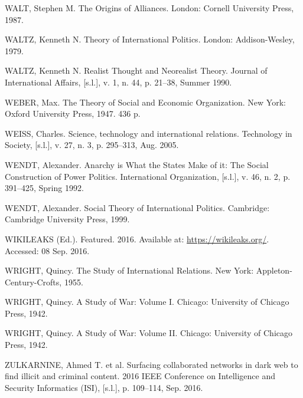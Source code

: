 \begin{list}{}{\setlength{\leftmargin}{0pt}\setlength{\itemsep}{6pt}\setlength{\parsep}{0pt}}
\item WALT, Stephen M. The Origins of Alliances. London: Cornell University Press, 1987.

\item WALTZ, Kenneth N. Theory of International Politics. London: Addison-Wesley, 1979.

\item WALTZ, Kenneth N. Realist Thought and Neorealist Theory. Journal of International Affairs, [s.l.], v. 1, n. 44, p. 21--38, Summer 1990.

\item WEBER, Max. The Theory of Social and Economic Organization. New York: Oxford University Press, 1947. 436 p.

\item WEISS, Charles. Science, technology and international relations. Technology in Society, [s.l.], v. 27, n. 3, p. 295--313, Aug. 2005.

\item WENDT, Alexander. Anarchy is What the States Make of it: The Social Construction of Power Politics. International Organization, [s.l.], v. 46, n. 2, p. 391--425, Spring 1992.

\item WENDT, Alexander. Social Theory of International Politics. Cambridge: Cambridge University Press, 1999.

\item WIKILEAKS (Ed.). Featured. 2016. Available at: \url{https://wikileaks.org/}. Accessed: 08 Sep. 2016.

\item WRIGHT, Quincy. The Study of International Relations. New York: Appleton-Century-Crofts, 1955.

\item WRIGHT, Quincy. A Study of War: Volume I. Chicago: University of Chicago Press, 1942.

\item WRIGHT, Quincy. A Study of War: Volume II. Chicago: University of Chicago Press, 1942.

\item ZULKARNINE, Ahmed T. et al. Surfacing collaborated networks in dark web to find illicit and criminal content. 2016 IEEE Conference on Intelligence and Security Informatics (ISI), [s.l.], p. 109--114, Sep. 2016.

\end{list}
